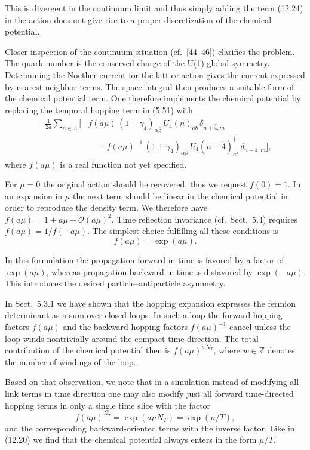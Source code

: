This is divergent in the continuum limit and thus simply adding the term
(12.24) in the action does not give rise to a proper discretization of the
chemical potential.

Closer inspection of the continuum situation (cf.\ [44--46]) clarifies the
problem. The quark number is the conserved charge of the U(1) global symmetry.
Determining the Noether current for the lattice action gives the current
expressed by nearest neighbor terms. The space integral then produces a
suitable form of the chemical potential term. One therefore implements the
chemical potential by replacing the temporal hopping term in (5.51) with
\begin{equation}
\begin{split}
  -\frac{1}{2a}\sum_{n\in\Lambda}\Big[
  &f(a\mu)\,(1-\gamma_4)_{\alpha\beta}\,U_4(n)_{ab}\,\delta_{n+\hat{4},m}\\
  &\quad - f(a\mu)^{-1}\,(1+\gamma_4)_{\alpha\beta}\,
    U_4(n-\hat{4})^\dagger_{ab}\,\delta_{n-\hat{4},m}
  \Big],
\end{split}
\end{equation}
where $f(a\mu)$ is a real function not yet specified.

For $\mu = 0$ the original action should be recovered, thus we request
$f(0) = 1$. In an expansion in $\mu$ the next term should be linear in the
chemical potential in order to reproduce the density term. We therefore have
$f(a\mu) = 1 + a\mu + \mathcal{O}(a\mu)^2$. Time reflection invariance
(cf.\ Sect.~5.4) requires $f(a\mu) = 1/f(-a\mu)$. The simplest choice
fulfilling all these conditions is
\begin{equation}
  f(a\mu) = \exp(a\mu).
\end{equation}

In this formulation the propagation forward in time is favored by a factor of
$\exp(a\mu)$, whereas propagation backward in time is disfavored by
$\exp(-a\mu)$. This introduces the desired particle--antiparticle asymmetry.

In Sect.~5.3.1 we have shown that the hopping expansion expresses the fermion
determinant as a sum over closed loops. In such a loop the forward hopping
factors $f(a\mu)$ and the backward hopping factors $f(a\mu)^{-1}$ cancel unless
the loop winds nontrivially around the compact time direction. The total
contribution of the chemical potential then is $f(a\mu)^{wN_T}$, where
$w \in \mathbb{Z}$ denotes the number of windings of the loop.

Based on that observation, we note that in a simulation instead of modifying
all link terms in time direction one may also modify just all forward
time-directed hopping terms in only a single time slice with the factor
\begin{equation}
  f(a\mu)^{N_T} = \exp(a\mu N_T) = \exp(\mu/T),
\end{equation}
and the corresponding backward-oriented terms with the inverse factor. Like in
(12.20) we find that the chemical potential always enters in the form $\mu/T$.

